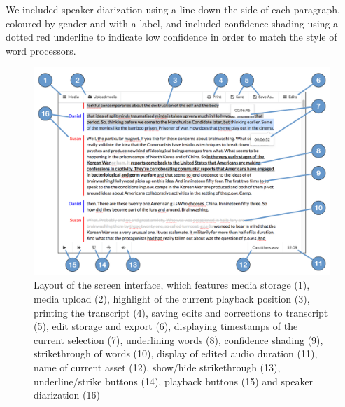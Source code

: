 We included speaker diarization using a line down the side of each paragraph, coloured by gender and with a label, and
included confidence shading using a dotted red underline to indicate low confidence in order to match the style of word
processors.



\begin{figure}[p]
  \centering
  \includegraphics[width=\columnwidth]{figs/discourse-interface-labelled.pdf}
  \caption{Layout of the screen interface, which features 
    media storage (1),
    media upload (2),
    highlight of the current playback position (3),
    printing the transcript (4),
    saving edits and corrections to transcript (5),
    edit storage and export (6),
    displaying timestamps of the current selection (7),
    underlining words (8),
    confidence shading (9),
    strikethrough of words (10),
    display of edited audio duration (11),
    name of current asset (12),
    show/hide strikethrough (13),
    underline/strike buttons (14),
    playback buttons (15)
  and speaker diarization (16)}
  \label{fig:dialogger-interface}
\end{figure}

